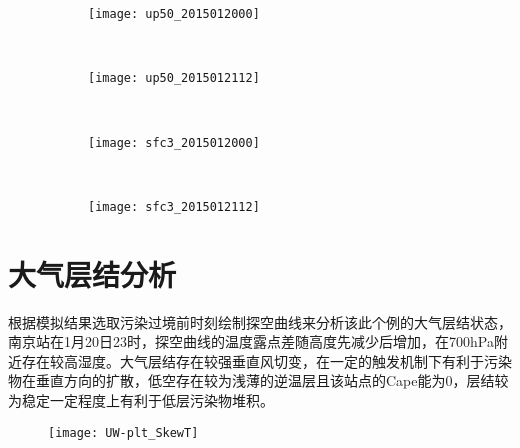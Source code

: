 \begin{figure}[!htbp]
    \centering
    \begin{subfigure}[b]{0.35\textwidth}
      \texttt{[image: up50\_2015012000]}
      \caption{}
      \label{fig:up50_2015012000}
    \end{subfigure}%
    ~%
    \begin{subfigure}[b]{0.35\textwidth}
      \texttt{[image: up50\_2015012112]}
      \caption{}
      \label{fig:up50_2015012112}
    \end{subfigure}
    \\%
    \begin{subfigure}[b]{0.35\textwidth}
      \texttt{[image: sfc3\_2015012000]}
      \caption{}
      \label{fig:sfc3_2015012000}
    \end{subfigure}%
    ~%
    \begin{subfigure}[b]{0.35\textwidth}
      \texttt{[image: sfc3\_2015012112]}
      \caption{}
      \label{fig:sfc3_2015012112}
    \end{subfigure}
    \label{fig:oaspl}
\end{figure}

\section{大气层结分析}

根据模拟结果选取污染过境前时刻绘制探空曲线来分析该此个例的大气层结状态，南京站在1月20日23时，探空曲线的温度露点差随高度先减少后增加，在700hPa附近存在较高湿度。大气层结存在较强垂直风切变，在一定的触发机制下有利于污染物在垂直方向的扩散，低空存在较为浅薄的逆温层且该站点的Cape能为0，层结较为稳定一定程度上有利于低层污染物堆积。

\begin{figure}[!htbp]
    \centering
    \texttt{[image: UW-plt\_SkewT]}
    \label{fig:UW-plt_SkewT_trim}
\end{figure}

